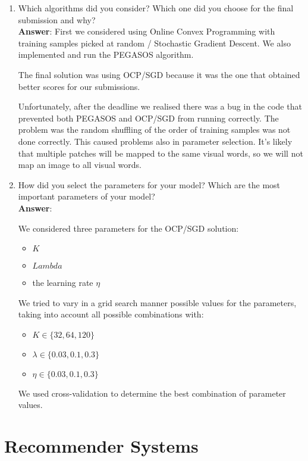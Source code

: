 \documentclass[11pt]{article}
\begin{document}
\begin{enumerate} \item Which algorithms did you consider? Which one did you
choose for the final submission and why? \\
\textbf{Answer}:
First we considered using Online Convex Programming with training samples
picked at random / Stochastic Gradient Descent. We also implemented and run the
PEGASOS algorithm. 

The final solution was using OCP/SGD because it was the one that obtained
better scores for our submissions. 

Unfortunately, after the deadline we realised there was a bug in the code that
prevented both PEGASOS and OCP/SGD from running correctly. The problem was the
random shuffling of the order of training samples was not done correctly. This
caused problems also in parameter selection. It's likely that multiple patches
will be mapped to the same visual words, so we will not map an image to all
visual words.

\item How did you select the parameters for your model? Which are the
  most important parameters of your model? \\
\textbf{Answer}:

We considered three parameters for the OCP/SGD solution: 
\begin{itemize}
\item $K$
\item $Lambda$ 
\item the learning rate $\eta$
\end{itemize}

We tried to vary in a grid search manner possible values for the parameters,
taking into account all possible combinations with:
\begin{itemize}
\item $K \in \{32, 64, 120\}$
\item $\lambda \in \{0.03, 0.1, 0.3\}$
\item $\eta \in \{0.03, 0.1, 0.3\}$
\end{itemize}
We used cross-validation to determine the best combination of parameter values.

\end{enumerate}

\section{Recommender Systems}
\end{document}
